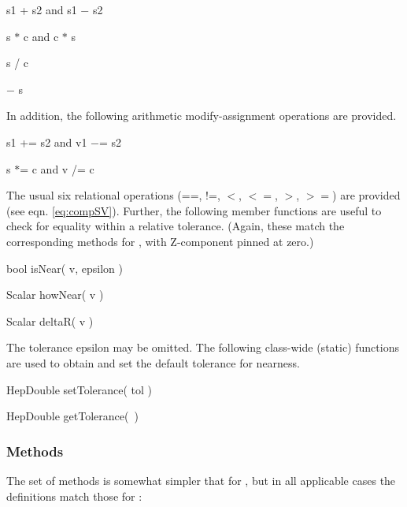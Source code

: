 \begin{shortlist}
  \item s1 + s2  and  s1 $-$ s2
  \item s $*$ c  and  c $*$ s
  \item s / c
  \item $-$ s
\end{shortlist}

\noindent
In addition, 
the following arithmetic modify-assignment operations are provided.

\begin{shortlist}
  \item s1 += s2  and  v1 $-$= s2
  \item s $*$= c  and  v /= c
\end{shortlist}

\noindent
The usual six relational operations
(==, !=, $<$, $<=$, $>$, $>=$) are provided (see eqn. \ref{eq:compSV}).
Further, the following member functions are useful to check for equality
within a relative tolerance.  (Again, these match the corresponding methods 
for \SV, with Z-component pinned at zero.)

\begin{shortlist}
  \item bool isNear( v, epsilon ) \see{\ref{eq:isNear}}
  \item Scalar howNear( v ) \see{\ref{eq:howNear}, \ref{eq:howNear:2}, \ref{eq:howNear:3}}
  \item Scalar deltaR( v ) \see{\ref{eq:deltaR}}
\end{shortlist}

\noindent
The tolerance epsilon may be omitted.
The following class-wide (static) functions are used
to obtain and set the default tolerance for nearness.

\begin{shortlist}
  \item HepDouble setTolerance( tol )	\see{\ref{eq:epsildef}}
  \item HepDouble getTolerance(~)
\end{shortlist}


\subsubsection{Methods}

The set of methods is somewhat simpler that for \SV, but in all applicable
cases the definitions match those for \SV:

